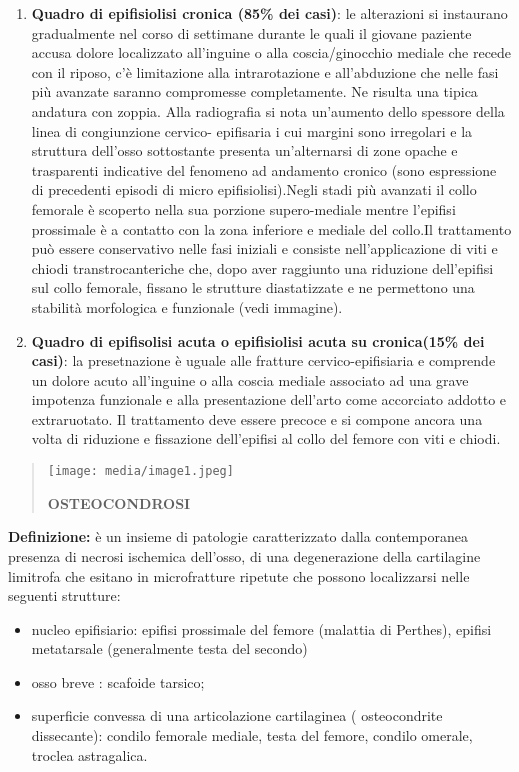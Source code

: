 \documentclass[]{article}
\begin{document}
\begin{enumerate}
\def\labelenumi{\arabic{enumi}.}
\item
  \textbf{Quadro di epifisiolisi cronica (85\% dei casi)}: le
  alterazioni si instaurano gradualmente nel corso di settimane durante
  le quali il giovane paziente accusa dolore localizzato all'inguine o
  alla coscia/ginocchio mediale che recede con il riposo, c'è
  limitazione alla intrarotazione e all'abduzione che nelle fasi più
  avanzate saranno compromesse completamente. Ne risulta una tipica
  andatura con zoppia. Alla radiografia si nota un'aumento dello
  spessore della linea di congiunzione cervico- epifisaria i cui margini
  sono irregolari e la struttura dell'osso sottostante presenta
  un'alternarsi di zone opache e trasparenti indicative del fenomeno ad
  andamento cronico (sono espressione di precedenti episodi di micro
  epifisiolisi).Negli stadi più avanzati il collo femorale è scoperto
  nella sua porzione supero-mediale mentre l'epifisi prossimale è a
  contatto con la zona inferiore e mediale del collo.Il trattamento può
  essere conservativo nelle fasi iniziali e consiste nell'applicazione
  di viti e chiodi transtrocanteriche che, dopo aver raggiunto una
  riduzione dell'epifisi sul collo femorale, fissano le strutture
  diastatizzate e ne permettono una stabilità morfologica e funzionale
  (vedi immagine).
\item
  \textbf{Quadro di epifisolisi acuta o epifisiolisi acuta su
  cronica(15\% dei casi)}: la presetnazione è uguale alle fratture
  cervico-epifisiaria e comprende un dolore acuto all'inguine o alla
  coscia mediale associato ad una grave impotenza funzionale e alla
  presentazione dell'arto come accorciato addotto e extraruotato. Il
  trattamento deve essere precoce e si compone ancora una volta di
  riduzione e fissazione dell'epifisi al collo del femore con viti e
  chiodi.
\end{enumerate}

\begin{quote}
\texttt{[image: media/image1.jpeg]}

\textbf{OSTEOCONDROSI}
\end{quote}

\textbf{Definizione:} è un insieme di patologie caratterizzato dalla
contemporanea presenza di necrosi ischemica dell'osso, di una
degenerazione della cartilagine limitrofa che esitano in microfratture
ripetute che possono localizzarsi nelle seguenti strutture:

\begin{itemize}
\item
  nucleo epifisiario: epifisi prossimale del femore (malattia di
  Perthes), epifisi metatarsale (generalmente testa del secondo)
\item
  osso breve : scafoide tarsico;
\item
  superficie convessa di una articolazione cartilaginea ( osteocondrite
  dissecante): condilo femorale mediale, testa del femore, condilo
  omerale, troclea astragalica.
\end{itemize}
\end{document}
